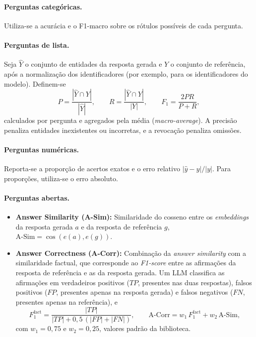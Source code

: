 \documentclass{article}
\begin{document}
\paragraph{Perguntas categóricas.} Utiliza-se a acurácia e o F1-macro sobre os rótulos possíveis de cada pergunta.

\paragraph{Perguntas de lista.} Seja $\hat{Y}$ o conjunto de entidades da resposta gerada e $Y$ o conjunto de referência, após a normalização dos identificadores (por exemplo, para os identificadores do modelo). Definem-se
\begin{equation}
	P = \frac{|\hat{Y} \cap Y|}{|\hat{Y}|}, \qquad
	R = \frac{|\hat{Y} \cap Y|}{|Y|}, \qquad
	F_1 = \frac{2PR}{P + R},
\end{equation}
calculados por pergunta e agregados pela média (\textit{macro-average}). A precisão penaliza entidades inexistentes ou incorretas, e a revocação penaliza omissões.

\paragraph{Perguntas numéricas.} Reporta-se a proporção de acertos exatos e o erro relativo $|\hat{y} - y| / |y|$. Para proporções, utiliza-se o erro absoluto.

\paragraph{Perguntas abertas.}
\begin{itemize}
	\item \textbf{Answer Similarity (A-Sim):} Similaridade do cosseno entre os \textit{embeddings} da resposta gerada $a$ e da resposta de referência $g$, $\text{A-Sim} = \cos(e(a), e(g))$.

	\item \textbf{Answer Correctness (A-Corr):} Combinação da \textit{answer similarity} com a similaridade factual, que corresponde ao \textit{F1-score} entre as afirmações da resposta de referência e as da resposta gerada. Um LLM classifica as afirmações em verdadeiros positivos ($TP$, presentes nas duas respostas), falsos positivos ($FP$, presentes apenas na resposta gerada) e falsos negativos ($FN$, presentes apenas na referência), e
	\begin{equation}
		F_1^{\text{fact}} = \frac{|TP|}{|TP| + 0{,}5\,(|FP| + |FN|)}, \qquad
		\text{A-Corr} = w_1 \, F_1^{\text{fact}} + w_2 \, \text{A-Sim},
	\end{equation}
	com $w_1 = 0{,}75$ e $w_2 = 0{,}25$, valores padrão da biblioteca.
\end{itemize}
\end{document}
